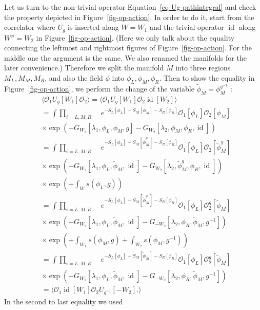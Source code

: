 \documentclass[
  letterpaper,
  DIV=11,
  numbers=noendperiod]{scrreport}
\DeclareMathOperator{\id}{id}
\begin{document}
Let us turn to the non-trivial operator
Equation~\ref{eq-Ug-pathintegral} and check the property depicted in
Figure~\ref{fig-op-action}. In order to do it, start from the correlator
where \(U_g\) is inserted along \(W=W_1\) and the trivial operator
\(\id\) along \(W''=W_2\) in Figure~\ref{fig-op-action}. (Here we only
talk about the equality connecting the leftmost and rightmost figures of
Figure~\ref{fig-op-action}. For the middle one the argument is the same.
We also renamed the manifolds for the later convenience.) Therefore we
split the manifold \(M\) into three regions \(M_L,M_M,M_R\), and also
the field \(\phi\) into \(\phi_L,\phi_M,\phi_R\). Then to show the
equality in Figure~\ref{fig-op-action}, we perform the change of the
variable \(\widetilde{\phi}_M = \phi_M^{g^{-1}}\) : \[
\begin{aligned}
    &\langle \mathcal{O}_1 U_g[W_1] \mathcal{O}_2 \rangle = \langle \mathcal{O}_1 U_g[W_1] \mathcal{O}_2 \id[W_2] \rangle \\
     &= \int \prod_{i=L,M,R}\mathop{\mathcal{D}^{M_i}\phi_i} \mathop{\prod_{a=1,2}\mathcal{D}^{W_a} \lambda_a} e^{-S_L[\phi_L]-S_M[\phi_M]-S_R[\phi_R]}\mathcal{O}_1[\phi_L] \mathcal{O}_2[\phi_M]
     \\ 
     &\times \exp\left(-G_{W_1}[\lambda_1,\phi_L,\phi_M,g]-G_{W_2}[\lambda_2,\phi_M,\phi_R,\id]\right)\\
     &= \int \prod_{i=L,M,R}\mathop{\mathcal{D}^{M_i}\phi_i} \mathop{\prod_{a=1,2}\mathcal{D}^{W_a}\lambda_a} e^{-S_L[\phi_L]-S_M[\widetilde\phi_M^g]-S_R[\phi_R]}\mathcal{O}_1[\phi_L] \mathcal{O}_2[\widetilde\phi_M^g]
     \\ 
     &\times \exp\left(-G_{W_1}[\lambda_1,\phi_L,\widetilde\phi_M,\id]-G_{W_2}[\lambda_2,\widetilde{\phi}_M^g,\phi_R,\id]\right)\\ 
     &\times \exp\left( + \int_W s(\phi_L,g) \right)\\ 
     &= \int \prod_{i=L,M,R}\mathop{\mathcal{D}^{M_i}\phi_i} \mathop{\prod_{a=1,2}\mathcal{D}^{W_a}\lambda_a} e^{-S_L[\phi_L]-S_M[\widetilde\phi_M^g]-S_R[\phi_R]}\mathcal{O}_1[\phi_L] \mathcal{O}_2^g[\widetilde\phi_M]
     \\ 
     &\times \exp\left(-G_{W_1}[\lambda_1,\phi_L,\widetilde\phi_M,\id]-G_{-W_2}[\lambda_2,\phi_R,\widetilde{\phi}_M,g^{-1}]\right)\\ 
     &\times \exp\left( + \int_{W_1} s(\phi_M,g) + \int_{W_2} s(\phi_M,g^{-1})  \right)\\
     &= \int \prod_{i=L,M,R}\mathop{\mathcal{D}^{M_i}\phi_i} \mathop{\prod_{a=1,2}\mathcal{D}^{W_a}\lambda_a} e^{-S_L[\phi_L]-S_M[\widetilde\phi_M]-S_R[\phi_R]}\mathcal{O}_1[\phi_L] \mathcal{O}_2^g[\widetilde\phi_M]
     \\ 
     &\times \exp\left(-G_{W_1}[\lambda_1,\phi_L,\widetilde\phi_M,\id]-G_{-W_2}[\lambda_2,\phi_R,\widetilde{\phi}_M,g^{-1}]\right)\\
     &= \langle \mathcal{O}_1 \id[W_1] \mathcal{O}_2 U_{g^{-1}}[-W_2]. \rangle
\end{aligned}
\] In the second to last equality we used
\end{document}
